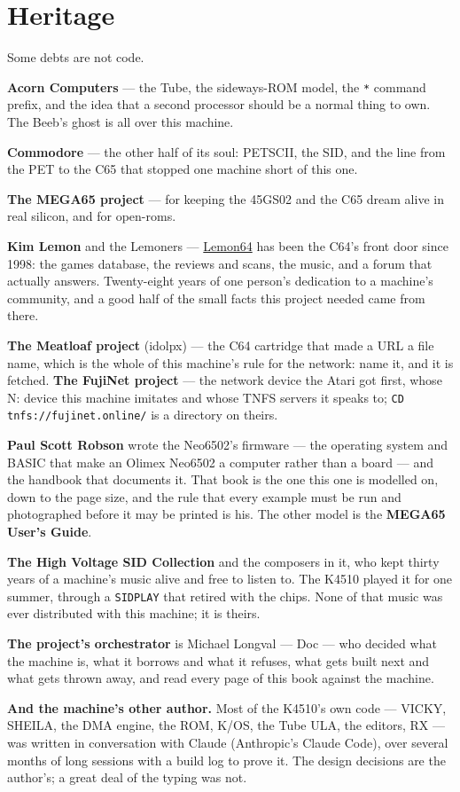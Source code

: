 \section{Heritage}
Some debts are not code.

\textbf{Acorn Computers} --- the Tube, the sideways-ROM model, the
\verb|*| command prefix, and the idea that a second processor should
be a normal thing to own. The Beeb's ghost is all over this machine.

\textbf{Commodore} --- the other half of its soul: PETSCII, the SID,
and the line from the PET to the C65 that stopped one machine short of
this one.

\textbf{The MEGA65 project} --- for keeping the 45GS02 and the C65
dream alive in real silicon, and for open-roms.

\textbf{Kim Lemon} and the Lemoners --- \href{https://www.lemon64.com}{Lemon64}
has been the C64's front door since 1998: the games database, the
reviews and scans, the music, and a forum that actually answers.
Twenty-eight years of one person's dedication to a machine's community,
and a good half of the small facts this project needed came from there.

\textbf{The Meatloaf project} (idolpx) --- the C64 cartridge that made
a URL a file name, which is the whole of this machine's rule for the
network: name it, and it is fetched. \textbf{The FujiNet project} ---
the network device the Atari got first, whose N: device this machine
imitates and whose TNFS servers it speaks to;
\texttt{CD tnfs://fujinet.online/} is a directory on theirs.

\textbf{Paul Scott Robson} wrote the Neo6502's firmware --- the
operating system and BASIC that make an Olimex Neo6502 a computer
rather than a board --- and the handbook that documents it. That book
is the one this one is modelled on, down to the page size, and the rule
that every example must be run and photographed before it may be
printed is his. The other model is the \textbf{MEGA65 User's Guide}.

\textbf{The High Voltage SID Collection} and the composers in it, who
kept thirty years of a machine's music alive and free to listen to. The
K4510 played it for one summer, through a \verb|SIDPLAY| that retired
with the chips. None of that music was ever distributed with this
machine; it is theirs.

\begin{aside}
\textbf{The project's orchestrator} is Michael Longval --- Doc --- who
decided what the machine is, what it borrows and what it refuses, what
gets built next and what gets thrown away, and read every page of this
book against the machine.

\textbf{And the machine's other author.} Most of the K4510's own code
--- VICKY, SHEILA, the DMA engine, the ROM, K/OS, the Tube ULA, the
editors, RX --- was written in conversation with Claude
(Anthropic's Claude Code), over several months of long sessions with a
build log to prove it. The design decisions are the author's; a great
deal of the typing was not.
\end{aside}

